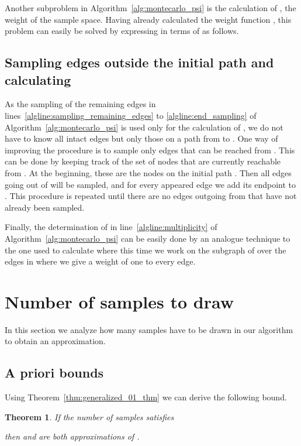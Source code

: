 \documentclass{article}
\newtheorem{theorem}{Theorem}
\begin{document}
Another subproblem in Algorithm~\ref{alg:montecarlo_psi} is the
calculation of , the weight of the sample
space. Having already calculated the weight function
, this problem can easily be solved by
expressing  in terms of 
as follows.




\subsection{Sampling edges outside the initial path and calculating
\texorpdfstring{{}}{}}\label{subsec:sampling_remaining_edges}

As the sampling of the remaining edges in
lines~\ref{algline:sampling_remaining_edges} to
\ref{algline:end_sampling} of Algorithm~\ref{alg:montecarlo_psi}
is used only for the calculation of , we do not
have to know all intact edges but only those on a
path from  to . One way of improving the procedure is to
sample only edges that can be reached from . This can be done
by keeping track of the set of nodes  that
are currently reachable from
. At the beginning, these are the nodes on the initial path
. Then all edges going out of  will be
sampled, and for every appeared edge we add its endpoint to
. This procedure is repeated until there are
no edges outgoing from  that have not already been sampled.

Finally, the determination of  in
line~\ref{algline:multiplicity} of Algorithm~\ref{alg:montecarlo_psi}
can be easily done by an
analogue technique to the one used to calculate 
where this time we work on the subgraph of  over the edges in
 where we give a weight of one to every edge.

\section{Number of samples to draw}\label{sec:nb_samples}

In this section we analyze how many samples have to be drawn
in our algorithm to obtain an  approximation.

\subsection{A priori bounds}

Using Theorem~\ref{thm:generalized_01_thm} we can derive the following bound.

\begin{theorem}\label{thm:montecarlo_importance_approx}
If the number of samples  satisfies

then  and  are both
 approximations of .
\end{theorem}
\end{document}
